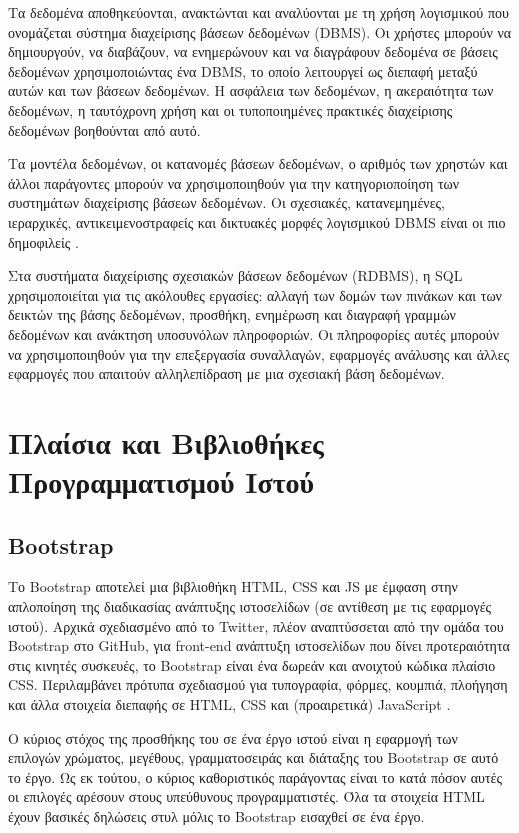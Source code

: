 Τα δεδομένα αποθηκεύονται, ανακτώνται και αναλύονται με τη χρήση λογισμικού που ονομάζεται σύστημα διαχείρισης βάσεων δεδομένων (DBMS). Οι χρήστες μπορούν να δημιουργούν, να διαβάζουν, να ενημερώνουν και να διαγράφουν δεδομένα σε βάσεις δεδομένων χρησιμοποιώντας ένα DBMS, το οποίο λειτουργεί ως διεπαφή μεταξύ αυτών και των βάσεων δεδομένων. Η ασφάλεια των δεδομένων, η ακεραιότητα των δεδομένων, η ταυτόχρονη χρήση και οι τυποποιημένες πρακτικές διαχείρισης δεδομένων βοηθούνται από αυτό.

Τα μοντέλα δεδομένων, οι κατανομές βάσεων δεδομένων, ο αριθμός των χρηστών και άλλοι παράγοντες μπορούν να χρησιμοποιηθούν για την κατηγοριοποίηση των συστημάτων διαχείρισης βάσεων δεδομένων. Οι σχεσιακές, κατανεμημένες, ιεραρχικές, αντικειμενοστραφείς και δικτυακές μορφές λογισμικού DBMS είναι οι πιο δημοφιλείς \cite{DBMS}.

Στα συστήματα διαχείρισης σχεσιακών βάσεων δεδομένων (RDBMS), η SQL χρησιμοποιείται για τις ακόλουθες εργασίες: αλλαγή των δομών των πινάκων και των δεικτών της βάσης δεδομένων, προσθήκη, ενημέρωση και διαγραφή γραμμών δεδομένων και ανάκτηση υποσυνόλων πληροφοριών. Οι πληροφορίες αυτές μπορούν να χρησιμοποιηθούν για την επεξεργασία συναλλαγών, εφαρμογές ανάλυσης και άλλες εφαρμογές που απαιτούν αλληλεπίδραση με μια σχεσιακή βάση δεδομένων.

\section{Πλαίσια και Βιβλιοθήκες Προγραμματισμού Ιστού}

\subsection{Bootstrap}
Το Bootstrap αποτελεί μια βιβλιοθήκη HTML, CSS και JS με έμφαση στην απλοποίηση της διαδικασίας ανάπτυξης ιστοσελίδων (σε αντίθεση με τις εφαρμογές ιστού). Αρχικά σχεδιασμένο από το Twitter, πλέον αναπτύσσεται από την ομάδα του Bootstrap στο GitHub, για front-end ανάπτυξη ιστοσελίδων που δίνει προτεραιότητα στις κινητές συσκευές, το Bootstrap είναι ένα δωρεάν και ανοιχτού κώδικα πλαίσιο CSS. Περιλαμβάνει πρότυπα σχεδιασμού για τυπογραφία, φόρμες, κουμπιά, πλοήγηση και άλλα στοιχεία διεπαφής σε HTML, CSS και (προαιρετικά) JavaScript \cite{Bootstrap}. 

Ο κύριος στόχος της προσθήκης του σε ένα έργο ιστού είναι η εφαρμογή των επιλογών χρώματος, μεγέθους, γραμματοσειράς και διάταξης του Bootstrap σε αυτό το έργο. Ως εκ τούτου, ο κύριος καθοριστικός παράγοντας είναι το κατά πόσον αυτές οι επιλογές αρέσουν στους υπεύθυνους προγραμματιστές. Όλα τα στοιχεία HTML έχουν βασικές δηλώσεις στυλ μόλις το Bootstrap εισαχθεί σε ένα έργο. 


